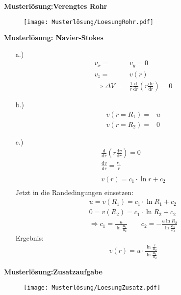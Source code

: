 \textbf{Musterlösung:Verengtes Rohr}

\begin{figure}[h]
  \texttt{[image: Musterlösung/LoesungRohr.pdf]}
\end{figure}
\FloatBarrier
\textbf{Musterlösung: Navier-Stokes}

\begin{itemize}
  \item[a.)]
    \begin{align*}
      v_x =& v_y = 0\\
      v_z =& v(r)\\
      \Rightarrow \Delta V =& \frac{1}{r}\frac{\text{d}}{\text{d}r}
      \left(r\frac{\text{d}v}{\text{d}r}\right) = 0
    \end{align*}
  \item[b.)]
    \begin{align*}
      v(r = R_1) =& u\\
      v(r = R_2) =& 0
    \end{align*}
  \item[c.)]
    \begin{align*}
      \frac{\text{d}}{\text{d}r}
      \left(r\frac{\text{d}v}{\text{d}r}\right) = 0\\
      \frac{\text{d}v}{\text{d}r} = \frac{c_1}{r}\\
      \\
      v(r) = c_1\cdot \ln{r} + c_2\\
    \end{align*}
    Jetzt in die Randedingungen einsetzen:
    \begin{align*}
      u = v(R_1) = c_1 \cdot \ln{R_1} + c_2\\
      0 = v(R_2) = c_1 \cdot \ln{R_2} + c_2\\
      \Rightarrow c_1 = \frac{u}{\ln{\frac{R_1}{R_2}}}\qquad
      c_2 = -\frac{u\ln{R_2}}{\ln{\frac{R_1}{R_2}}}
    \end{align*}
    Ergebnis:
    \begin{align*}
      v(r) = u\cdot\frac{\ln{\frac{r}{R_2}}}{\ln{\frac{R_1}{R_2}}}
    \end{align*}
\end{itemize}
\newpage
\textbf{Musterlösung:Zusatzaufgabe}

\begin{figure}[h]
  \texttt{[image: Musterlösung/LoesungZusatz.pdf]}
\end{figure}
